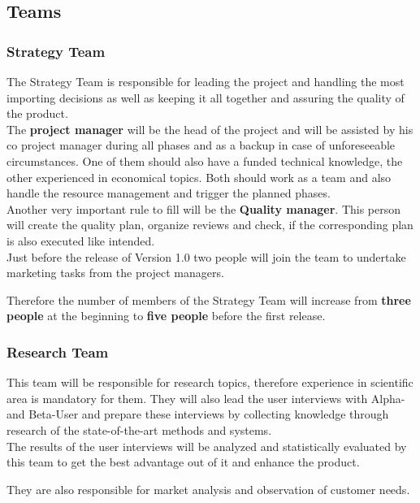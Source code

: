 \documentclass[a4paper,11pt]{article}
\begin{document}
\subsection{Teams}
\subsubsection{Strategy Team}
The Strategy Team is responsible for leading the project and handling the most importing decisions as well as keeping it all together and assuring the quality of the product. \\

The \textbf{project manager} will be the head of the project and will be assisted by his co project manager during all phases and as a backup in case of unforeseeable circumstances. One of them should also have a funded technical knowledge, the other experienced in economical topics. Both should work as a team and also handle the resource management and trigger the planned phases. \\

Another very important rule to fill will be the \textbf{Quality manager}. This person will create the quality plan, organize reviews and check, if the corresponding plan is also executed like intended. \\

Just before the release of Version 1.0 two people will join the team to undertake marketing tasks from the project managers.

Therefore the number of members of the Strategy Team will increase from \textbf{three people} at the beginning to \textbf{five people} before the first release.

\subsubsection{Research Team}
This team will be responsible for research topics, therefore experience in scientific area is mandatory for them. They will also lead the user interviews with Alpha- and Beta-User and prepare these interviews by collecting knowledge through research of the state-of-the-art methods and systems. \\

The results of the user interviews will be analyzed and statistically evaluated by this team to get the best advantage out of it and enhance the product.

They are also responsible for market analysis and observation of customer needs. \\
\end{document}
